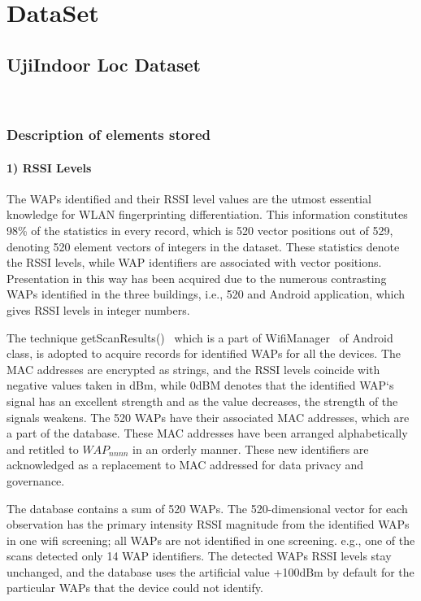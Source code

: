 \documentclass[a4paper,singleside,12pt]{report} %
\begin{document}
	\chapter{DataSet}
		\section{UjiIndoor Loc Dataset}~\cite{ujiindoor-data}
			\subsection{Description of elements stored}

				\subsubsection{1) RSSI Levels}

					The WAPs identified and their RSSI level values are the utmost essential knowledge for WLAN fingerprinting differentiation. 
					This information constitutes 98\% of the statistics in every record, which is 520 vector positions out of 529, denoting 520 element vectors of integers in the dataset. 
					These statistics denote the RSSI levels, while WAP identifiers are associated with vector positions. 
					Presentation in this way has been acquired due to the numerous contrasting WAPs identified in the three buildings, i.e., 520 and Android application, which gives RSSI levels in integer numbers.
					
					The technique getScanResults()~\cite{android-wifi-manager} which is a part of WifiManager~\cite{android-wifi-getscan-method} of Android class, is adopted to acquire records for identified WAPs for all the devices. 
					The MAC addresses are encrypted as strings, and the RSSI levels coincide with negative values taken in dBm, while 0dBM denotes that the identified WAP`s signal has an excellent strength and as the value decreases, the strength of the signals weakens. 
					The 520 WAPs have their associated MAC addresses, which are a part of the database. 
					These MAC addresses have been arranged alphabetically and retitled to $WAP_{nnnn}$ in an orderly manner. 
					These new identifiers are acknowledged as a replacement to MAC addressed for data privacy and governance. 
					
					The database contains a sum of 520 WAPs. 
					The 520-dimensional vector for each observation has the primary intensity RSSI magnitude from the identified WAPs in one wifi screening; all WAPs are not identified in one screening. e.g., one of the scans detected only 14 WAP identifiers. 
					The detected WAPs RSSI levels stay unchanged, and the database uses the artificial value +100dBm by default for the particular WAPs that the device could not identify.
\end{document}
